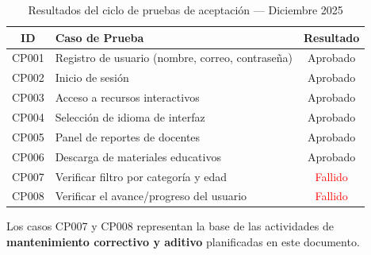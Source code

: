 \begin{table}[H]
\centering
\begin{tabular}{clc}
\toprule
\textbf{ID} & \textbf{Caso de Prueba} & \textbf{Resultado} \\
\midrule
CP001 & Registro de usuario (nombre, correo, contraseña)  & \textcolor{process}{Aprobado} \\
CP002 & Inicio de sesión                                  & \textcolor{process}{Aprobado} \\
CP003 & Acceso a recursos interactivos                    & \textcolor{process}{Aprobado} \\
CP004 & Selección de idioma de interfaz                   & \textcolor{process}{Aprobado} \\
CP005 & Panel de reportes de docentes                     & \textcolor{process}{Aprobado} \\
CP006 & Descarga de materiales educativos                 & \textcolor{process}{Aprobado} \\
CP007 & Verificar filtro por categoría y edad             & \textcolor{red}{Fallido}     \\
CP008 & Verificar el avance/progreso del usuario          & \textcolor{red}{Fallido}     \\
\bottomrule
\end{tabular}
\caption{Resultados del ciclo de pruebas de aceptación --- Diciembre 2025}
\label{tab:resultados-pruebas}
\end{table}

Los casos CP007 y CP008 representan la base de las actividades de
\textbf{mantenimiento correctivo y aditivo} planificadas en este documento.
